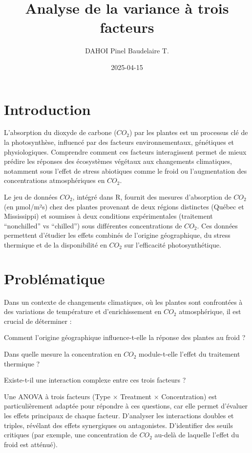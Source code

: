\documentclass[
]{article}
\title{Analyse de la variance à trois facteurs}
\author{DAHOI Pinel Baudelaire T.}
\date{2025-04-15}
\begin{document}
\maketitle

{
\setcounter{tocdepth}{2}
\tableofcontents
}
\section{Introduction}\label{introduction}

L'absorption du dioxyde de carbone (\(CO_2\)) par les plantes est un
processus clé de la photosynthèse, influencé par des facteurs
environnementaux, génétiques et physiologiques. Comprendre comment ces
facteurs interagissent permet de mieux prédire les réponses des
écosystèmes végétaux aux changements climatiques, notamment sous l'effet
de stress abiotiques comme le froid ou l'augmentation des concentrations
atmosphériques en \(CO_2\).

Le jeu de données \(CO_2\), intégré dans R, fournit des mesures
d'absorption de \(CO_2\) (en µmol/m²s) chez des plantes provenant de
deux régions distinctes (Québec et Mississippi) et soumises à deux
conditions expérimentales (traitement ``nonchilled'' vs ``chilled'')
sous différentes concentrations de \(CO_2\). Ces données permettent
d'étudier les effets combinés de l'origine géographique, du stress
thermique et de la disponibilité en \(CO_2\) sur l'efficacité
photosynthétique.

\section{Problématique}\label{probluxe9matique}

Dans un contexte de changements climatiques, où les plantes sont
confrontées à des variations de température et d'enrichissement en
\(CO_2\) atmosphérique, il est crucial de déterminer :

Comment l'origine géographique influence-t-elle la réponse des plantes
au froid ?

Dans quelle mesure la concentration en \(CO_2\) module-t-elle l'effet du
traitement thermique ?

Existe-t-il une interaction complexe entre ces trois facteurs ?

Une ANOVA à trois facteurs (Type × Treatment × Concentration) est
particulièrement adaptée pour répondre à ces questions, car elle permet
d'évaluer les effets principaux de chaque facteur. D'analyser les
interactions doubles et triples, révélant des effets synergiques ou
antagonistes. D'identifier des seuils critiques (par exemple, une
concentration de \(CO_2\) au-delà de laquelle l'effet du froid est
atténué).
\end{document}
